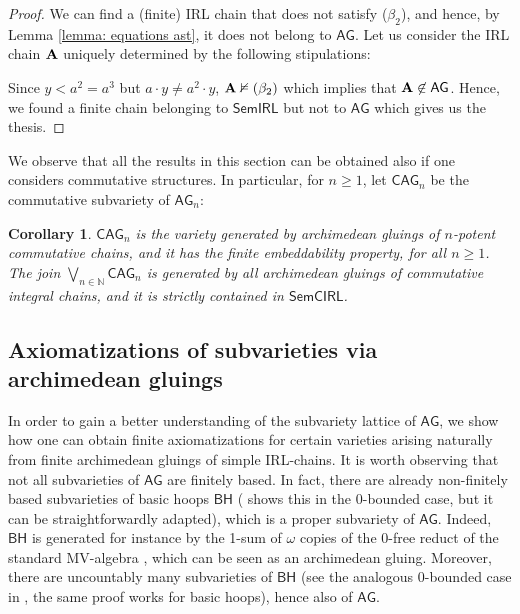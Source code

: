 \documentclass{amsart}
\newtheorem{corollary}[theorem]{Corollary}
\theoremstyle{definition}
\numberwithin{equation}{section}
\newcommand{\alg}[1]{{\textbf{\upshape #1}}}  %
\newcommand{\vv}[1]{\mathsf {#1}}
\newcommand{\BG}{\vv{AG}}
\begin{document}
\begin{proof}
	We can find a (finite) IRL chain that does not satisfy ($\beta_2$), and hence, by Lemma \ref{lemma: equations ast}, it does not belong to $\BG$. Let us consider the IRL chain $\alg A$ uniquely determined by the following stipulations:
\begin{center}
\end{center}
	Since $y < a^2=a^3$ but $a \cdot y \neq a^2 \cdot y$, $\alg A \nvDash (\beta_2)$ which implies that $\alg A \not \in \BG$. Hence, we found a finite chain belonging to $\vv{SemIRL}$ but not to $\BG$ which gives us the thesis.
	\end{proof}
We observe that all the results in this section can be obtained also if one considers commutative structures. In particular, for $n \geq 1$, let $\vv{C}\BG_n$ be the commutative subvariety of $\BG_n$:
\begin{corollary}
	$\vv C\BG_n$ is the variety generated by archimedean gluings of $n$-potent commutative chains, and it has the finite embeddability property, for all $n \geq 1$.
	The join $\bigvee_{n \in \mathbb{N}} \vv C\BG_n$ is generated by all archimedean gluings of commutative integral chains, and it is strictly contained in $\vv{SemCIRL}$.
\end{corollary}
\subsection{Axiomatizations of subvarieties via archimedean gluings}\label{subsection:axioms-subvar}
In order to gain a better understanding of the subvariety lattice of $\BG$, we show how one can obtain finite axiomatizations for certain varieties arising naturally from finite archimedean gluings of simple IRL-chains. It is worth observing that not all subvarieties of $\BG$ are finitely based. In fact, there are already non-finitely based subvarieties of basic hoops $\vv{BH}$ (\cite[Example 7.2]{AM2003} shows this in the $0$-bounded case, but it can be straightforwardly adapted), which is a proper subvariety of $\BG$. Indeed, $\vv{BH}$ is generated for instance by the 1-sum of $\omega$ copies of the $0$-free reduct of the standard MV-algebra \cite[Theorem 4.8]{AM2003}, which can be seen as an archimedean gluing. Moreover, there are uncountably many subvarieties of $\vv{BH}$ (see the analogous $0$-bounded case in \cite[Theorem 4.12]{AM2003}, the same proof works for basic hoops), hence also of $\BG$. 
\end{document}
